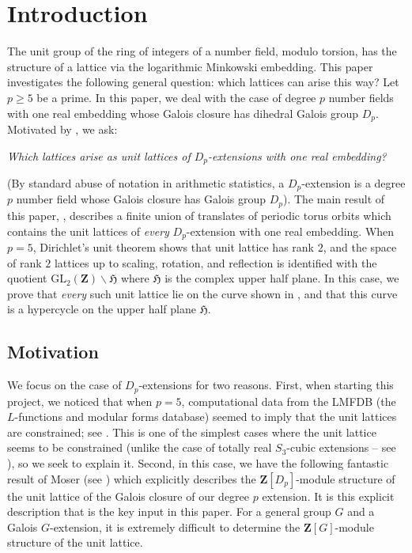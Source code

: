 \documentclass{amsart}
\newcommand{\ZZ}{\mathbf{Z}}
\newcommand{\mf}[1]{\mathfrak{#1}}
\newcommand{\gl}{\mathrm{GL}}
\numberwithin{equation}{section}
\begin{document}
\section{Introduction}

The unit group of the ring of integers of a number field, modulo torsion, has the structure of a lattice via the logarithmic Minkowski embedding. This paper investigates the following general question: which lattices can arise this way? Let $p \geq 5$ be a prime. In this paper, we deal with the case of degree $p$ number fields with one real embedding whose Galois closure has dihedral Galois group $D_p$. Motivated by , we ask:


\begin{center}
	\emph{Which lattices arise as unit lattices of $D_p$-extensions with one real embedding?}
\end{center}

(By standard abuse of notation in arithmetic statistics, a $D_p$-extension is a degree $p$ number field whose Galois closure has Galois group $D_p$). The main result of this paper, , describes a finite union of translates of periodic torus orbits which contains the unit lattices of \emph{every} $D_p$-extension with one real embedding. When $p = 5$, Dirichlet's unit theorem shows that unit lattice has rank $2$, and the space of rank $2$ lattices up to scaling, rotation, and reflection is identified with the quotient $\gl_2(\ZZ)\backslash\mf{H}$ where $\mf{H}$ is the complex upper half plane. In this case, we prove that \emph{every} such unit lattice lie on the curve shown in , and that this curve is a hypercycle on the upper half plane $\mf{H}$.

\subsection{Motivation}
\label{subsec:motivation}
We focus on the case of $D_p$-extensions for two reasons. First, when starting this project, we noticed that when $p = 5$, computational data from the LMFDB (the $L$-functions and modular forms database) seemed to imply that the unit lattices are constrained; see . This is one of the simplest cases where the unit lattice seems to be constrained (unlike the case of totally real $S_3$-cubic extensions -- see \cite{DS unit shape}), so we seek to explain it. Second, in this case, we have the following fantastic result of Moser (see \cite[Proposition III.1]{Moser1979}) which explicitly describes the $\ZZ[D_p]$-module structure of the unit lattice of the Galois closure of our degree $p$ extension. It is this explicit description that is the key input in this paper. For a general group $G$ and a Galois $G$-extension, it is extremely difficult to determine the $\ZZ[G]$-module structure of the unit lattice.
\end{document}
